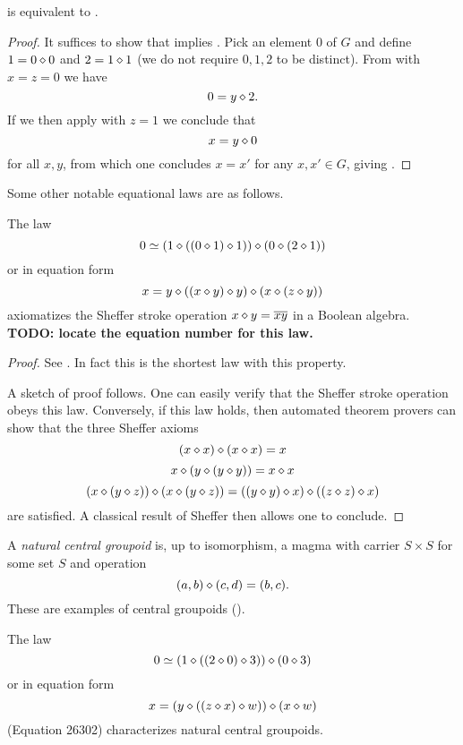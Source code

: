 \begin{theorem}[953 is equivalent to 2]\label{953_equiv_2}\leanok  {} is equivalent to .
\end{theorem}

\begin{proof}\leanok  It suffices to show that  implies .  Pick an element $0$ of $G$ and define $1 = 0 \diamond 0$ and $2 = 1 \diamond 1$ (we do not require $0,1,2$ to be distinct).
From  with $x=z=0$ we have
$$ 0 = y \diamond 2.$$
If we then apply  with $z=1$ we conclude that
$$ x = y \diamond 0$$
for all $x,y$, from which one concludes $x=x'$ for any $x,x' \in G$, giving .
\end{proof}


Some other notable equational laws are as follows.

\begin{theorem}\label{sheffer}  The law
$$ 0 \simeq (1 \diamond ((0 \diamond 1) \diamond 1)) \diamond (0 \diamond (2 \diamond 1))$$
or in equation form
$$ x = y \diamond ((x \diamond y) \diamond y) \diamond (x \diamond (z \diamond y)) $$
axiomatizes the Sheffer stroke operation $x \diamond y = \overline{xy}$ in a Boolean algebra. {\bf TODO: locate the equation number for this law.}
\end{theorem}

\begin{proof}
See \cite{mccune_et_al}.  In fact this is the shortest law with this property.

A sketch of proof follows.  One can easily verify that the Sheffer stroke operation obeys this law.  Conversely, if this law holds, then automated theorem provers can show that the three Sheffer axioms
$$ (x \diamond x) \diamond (x \diamond x)  = x$$
$$ x \diamond (y \diamond (y \diamond y)) = x \diamond x$$
$$ (x \diamond (y \diamond z)) \diamond (x \diamond (y \diamond z)) = ((y \diamond y) \diamond x) \diamond ((z \diamond z) \diamond x)$$
are satisfied.  A classical result of Sheffer \cite{sheffer} then allows one to conclude.
\end{proof}

A \emph{natural central groupoid} is, up to isomorphism, a magma with carrier $S \times S$ for some set $S$ and operation
$$ (a,b) \diamond (c,d) = (b,c).$$
These are examples of central groupoids ().

\begin{theorem}\label{natural-central-groupoid}  The law
$$ 0 \simeq (1 \diamond ((2 \diamond 0) \diamond 3)) \diamond (0 \diamond 3)$$
or in equation form
\begin{equation}\label{26302}
  x = (y \diamond ((z \diamond x) \diamond w)) \diamond (x \diamond w)
\end{equation}
(Equation 26302) characterizes natural central groupoids.
\end{theorem}

